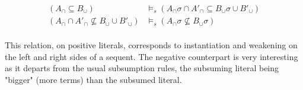 \documentclass{article}
\begin{document}
\begin{align*}
(A_\cap \subseteq B_\cup) &\models_s
    (A_\cap\sigma \cap A'_\cap \subseteq B_\cup\sigma \cup B'_\cup) \\
(A_\cap \cap A'_\cap \not\subseteq B_\cup \cup B'_\cup) &\models_s
    (A_\cap\sigma\not\subseteq B_\cup\sigma) \\
\end{align*}

This relation, on positive literals, corresponds to instantiation and
weakening on the left and right sides of a sequent. The negative counterpart
is very interesting as it departs from the usual subsumption rules, the
subsuming literal being "bigger" (more terms) than the subsumed literal.

\end{document}

